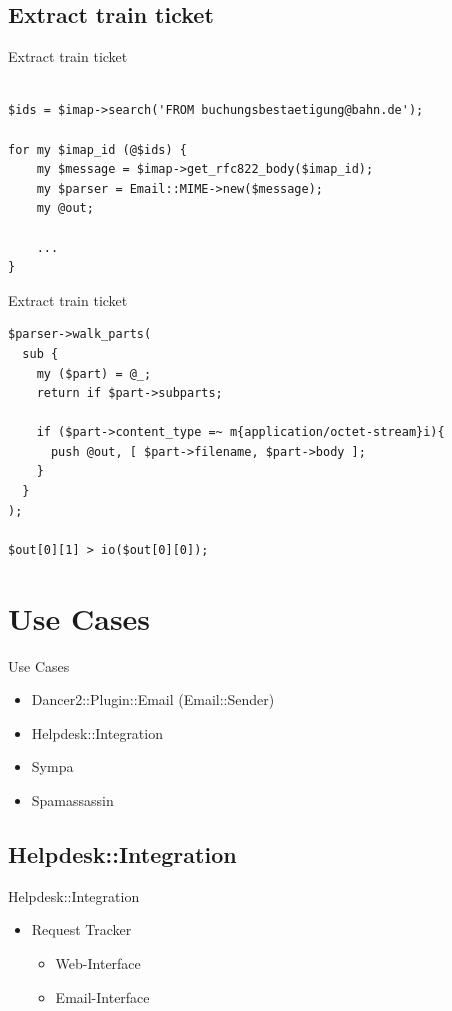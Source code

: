 \subsection{Extract train ticket}

\begin{frame}[fragile]{Extract train ticket}
\begin{verbatim}

$ids = $imap->search('FROM buchungsbestaetigung@bahn.de');

for my $imap_id (@$ids) {
    my $message = $imap->get_rfc822_body($imap_id);
    my $parser = Email::MIME->new($message);
    my @out;

    ...
}

\end{verbatim}
\end{frame}

\begin{frame}[fragile]{Extract train ticket}
\begin{verbatim}
$parser->walk_parts(
  sub {
    my ($part) = @_;
    return if $part->subparts;

    if ($part->content_type =~ m{application/octet-stream}i){
      push @out, [ $part->filename, $part->body ];
    }
  }
);

$out[0][1] > io($out[0][0]);
\end{verbatim}
\end{frame}

\section{Use Cases}

\begin{frame}{Use Cases}
  \begin{itemize}
  \item Dancer2::Plugin::Email (Email::Sender)
  \item Helpdesk::Integration
  \item Sympa
  \item Spamassassin
  \end{itemize}
\end{frame}

\subsection{Helpdesk::Integration}

\begin{frame}{Helpdesk::Integration}
  \begin{itemize}
  \item Request Tracker
    \begin{itemize}
    \item Web-Interface
    \item Email-Interface
    \end{itemize}
  \end{itemize}
\end{frame}

